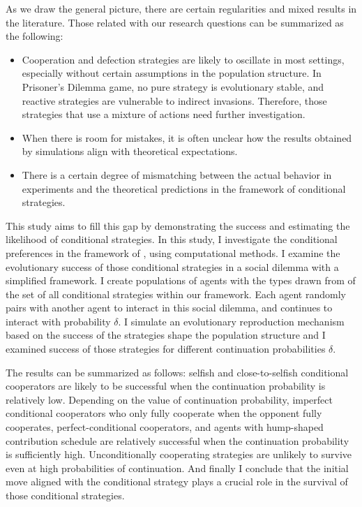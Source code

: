 \documentclass[12pt]{article}
\begin{document}
As we draw the general picture, there are certain regularities and mixed results in the literature. Those related with our research questions can be summarized as the following:

\begin{itemize}
    \item Cooperation and defection strategies are likely to oscillate in most settings, especially without certain assumptions in the population structure. In Prisoner's Dilemma game, no pure strategy is evolutionary stable, and reactive strategies are vulnerable to indirect invasions.\citep{Van_Veelen2012-ch, Van_Veelen2012-xf} Therefore, those strategies that use a mixture of actions need further investigation.

\item When there is room for mistakes, it is often unclear how the results obtained by simulations align with theoretical expectations.

\item There is a certain degree of mismatching between the actual behavior in experiments and the theoretical predictions in the framework of conditional strategies.
 
\end{itemize}

This study aims to fill this gap by demonstrating the success and estimating the likelihood of conditional strategies. In this study, I investigate the conditional preferences in the framework of \citet{Fischbacher2001}, using computational methods. I examine the evolutionary success of those conditional strategies in a social dilemma with a simplified framework.  I create populations of agents with the types drawn from of the set of all conditional strategies within our framework. Each agent randomly pairs with another agent to interact in this social dilemma, and continues to interact with probability $\delta$. I simulate an evolutionary reproduction mechanism based on the success of the strategies shape the population structure and I examined success of those strategies for different continuation probabilities $\delta$. 

The results can be summarized as follows: selfish and close-to-selfish conditional cooperators are likely to be successful when the continuation probability is relatively low. Depending on the value of continuation probability, imperfect conditional cooperators who only fully cooperate when the opponent fully cooperates, perfect-conditional cooperators, and agents with hump-shaped contribution schedule are relatively successful when the continuation probability is sufficiently high. Unconditionally cooperating strategies are unlikely to survive even at high probabilities of continuation. And finally I conclude that the initial move aligned with the conditional strategy plays a crucial role in the survival of those conditional strategies.
\end{document}

